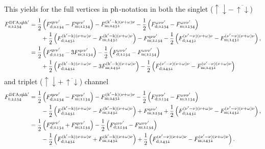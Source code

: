 \documentclass[main.tex]{subfiles}
\begin{document}
This yields for the full vertices in $\text{ph}$-notation in both the singlet ($\uparrow\downarrow-\,\overline{\uparrow\downarrow}$)
\begin{align}
\begin{split}
	F_{\text{s};\mathfrak{1234}}^{\text{D}\Gamma\text{A};\text{q}\text{k}\text{k}'}&=\frac12\left (F_{\text{d};\mathfrak{1234}}^{\text{q}\nu\nu'}-F_{\text{m};\mathfrak{1234}}^{\text{q}\nu\nu'}\right )-F_{\text{m};\mathfrak{1432}}^{(\text{k}'-\text{k})(\nu+\omega)\nu}-\frac12\left (F_{\text{d};\mathfrak{1234}}^{\omega\nu\nu'}-F_{\text{m};\mathfrak{1234}}^{\omega\nu\nu'}\right )\\
	&\qquad+\frac12\left (F_{\text{d};\mathfrak{1432}}^{(\text{k}'-\text{k})(\nu+\omega)\nu}-F_{\text{m};\mathfrak{1432}}^{(\text{k}'-\text{k})(\nu+\omega)\nu}\right )-F_{\text{m};\mathfrak{1234}}^{\text{q}\nu\nu'}-\frac12\left (F_{\text{d};\mathfrak{1432}}^{(\nu'-\nu)(\nu+\omega)\nu}-F_{\text{m};\mathfrak{1432}}^{(\nu'-\nu)(\nu+\omega)\nu}\right ),\\
	&=\frac12\left (F_{\text{d};\mathfrak{1234}}^{\text{q}\nu\nu'}-3F_{\text{m};\mathfrak{1234}}^{\text{q}\nu\nu'}\right )-\frac12\left (F_{\text{d};\mathfrak{1234}}^{\omega\nu\nu'}-F_{\text{m};\mathfrak{1234}}^{\omega\nu\nu'}\right )\\
	&\qquad+\frac12\left (F_{\text{d};\mathfrak{1432}}^{(\text{k}'-\text{k})(\nu+\omega)\nu}-3F_{\text{m};\mathfrak{1432}}^{(\text{k}'-\text{k})(\nu+\omega)\nu}\right )-\frac12\left (F_{\text{d};\mathfrak{1432}}^{(\nu'-\nu)(\nu+\omega)\nu}-F_{\text{m};\mathfrak{1432}}^{(\nu'-\nu)(\nu+\omega)\nu}\right )
\end{split}
\end{align}
and triplet ($\uparrow\downarrow+\,\overline{\uparrow\downarrow}$) channel
\begin{align}
\begin{split}
	F_{\text{t};\mathfrak{1234}}^{\text{D}\Gamma\text{A};\text{q}\text{k}\text{k}'}&=\frac12\left (F_{\text{d};\mathfrak{1234}}^{\text{q}\nu\nu'}-F_{\text{m};\mathfrak{1234}}^{\text{q}\nu\nu'}\right )-F_{\text{m};\mathfrak{1432}}^{(\text{k}'-\text{k})(\nu+\omega)\nu}-\frac12\left (F_{\text{d};\mathfrak{1234}}^{\omega\nu\nu'}-F_{\text{m};\mathfrak{1234}}^{\omega\nu\nu'}\right )\\
	&\qquad-\frac12\left (F_{\text{d};\mathfrak{1432}}^{(\text{k}'-\text{k})(\nu+\omega)\nu}-F_{\text{m};\mathfrak{1432}}^{(\text{k}'-\text{k})(\nu+\omega)\nu}\right )+F_{\text{m};\mathfrak{1234}}^{\text{q}\nu\nu'}+\frac12\left (F_{\text{d};\mathfrak{1432}}^{(\nu'-\nu)(\nu+\omega)\nu}-F_{\text{m};\mathfrak{1432}}^{(\nu'-\nu)(\nu+\omega)\nu}\right ),\\
	&=\frac12\left (F_{\text{d};\mathfrak{1234}}^{\text{q}\nu\nu'}+F_{\text{m};\mathfrak{1234}}^{\text{q}\nu\nu'}\right )-\frac12\left (F_{\text{d};\mathfrak{1234}}^{\omega\nu\nu'}-F_{\text{m};\mathfrak{1234}}^{\omega\nu\nu'}\right )\\
	&\qquad-\frac12\left (F_{\text{d};\mathfrak{1432}}^{(\text{k}'-\text{k})(\nu+\omega)\nu}+F_{\text{m};\mathfrak{1432}}^{(\text{k}'-\text{k})(\nu+\omega)\nu}\right )+\frac12\left (F_{\text{d};\mathfrak{1432}}^{(\nu'-\nu)(\nu+\omega)\nu}-F_{\text{m};\mathfrak{1432}}^{(\nu'-\nu)(\nu+\omega)\nu}\right ).
\end{split}
\end{align}
\end{document}
